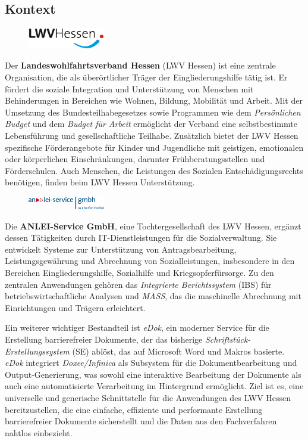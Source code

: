 \documentclass[12pt,oneside]{article}
\begin{document}
\subsection{Kontext}
\begin{figure} %
    \includegraphics[width=0.3\textwidth]{lwv.png} %
\end{figure}
Der \textbf{Landeswohlfahrtsverband Hessen} (LWV Hessen) ist eine zentrale Organisation, die als überörtlicher Träger der Eingliederungshilfe tätig ist. Er fördert die soziale Integration und Unterstützung von Menschen mit Behinderungen in Bereichen wie Wohnen, Bildung, Mobilität und Arbeit. Mit der Umsetzung des Bundesteilhabegesetzes sowie Programmen wie dem \textit{Persönlichen Budget} und dem \textit{Budget für Arbeit} ermöglicht der Verband eine selbstbestimmte Lebensführung und gesellschaftliche Teilhabe. Zusätzlich bietet der LWV Hessen spezifische Förderangebote für Kinder und Jugendliche mit geistigen, emotionalen oder körperlichen Einschränkungen, darunter Frühberatungsstellen und Förderschulen. Auch Menschen, die Leistungen des Sozialen Entschädigungsrechts benötigen, finden beim LWV Hessen Unterstützung.
\begin{figure} %
    \includegraphics[width=0.3\textwidth]{anlei.png} %
\end{figure}
Die \textbf{ANLEI-Service GmbH}, eine Tochtergesellschaft des LWV Hessen, ergänzt dessen Tätigkeiten durch IT-Dienstleistungen für die Sozialverwaltung. Sie entwickelt Systeme zur Unterstützung von Antragsbearbeitung, Leistungsgewährung und Abrechnung von Sozialleistungen, insbesondere in den Bereichen Eingliederungshilfe, Sozialhilfe und Kriegsopferfürsorge. Zu den zentralen Anwendungen gehören das \textit{Integrierte Berichtssystem} (IBS) für betriebswirtschaftliche Analysen und \textit{MASS}, das die maschinelle Abrechnung mit Einrichtungen und Trägern erleichtert.

Ein weiterer wichtiger Bestandteil ist \textit{eDok}, ein moderner Service für die Erstellung barrierefreier Dokumente, der das bisherige \textit{Schriftstück-Erstellungssystem} (SE) ablöst, das auf Microsoft Word und Makros basierte. \textit{eDok} integriert \textit{Doxee/Infinica} als Subsystem für die Dokumentbearbeitung und Output-Generierung, was sowohl eine interaktive Bearbeitung der Dokumente als auch eine automatisierte Verarbeitung im Hintergrund ermöglicht. Ziel ist es, eine universelle und generische Schnittstelle für die Anwendungen des LWV Hessen bereitzustellen, die eine einfache, effiziente und performante Erstellung barrierefreier Dokumente sicherstellt und die Daten aus den Fachverfahren nahtlos einbezieht.
\end{document}
